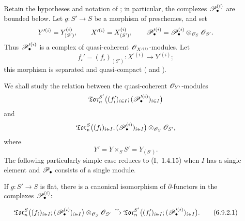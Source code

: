 \begin{env}[6.9.1]
\label{III.6.9.1}
Retain the hypotheses and notation of ; in
particular, the complexes $\mathscr{P}_\bullet^{(i)}$ are bounded below.
Let $g:S'\to S$ be a morphism of preschemes, and set
\[
  Y^{\prime(i)}=Y_{(S')}^{(i)},
  \qquad
  X^{\prime(i)}=X_{(S')}^{(i)},
  \qquad
  \mathscr{P}_\bullet^{\prime(i)}
  =
  \mathscr{P}_\bullet^{(i)}
  \otimes_{\mathscr{O}_S}\mathscr{O}_{S'}.
\]
Thus $\mathscr{P}_\bullet^{\prime(i)}$ is a complex of quasi-coherent
$\mathscr{O}_{X^{\prime(i)}}$-modules.  Let
\[
  f_i'=(f_i)_{(S')}:
  X^{\prime(i)}\longrightarrow Y^{\prime(i)};
\]
this morphism is separated and quasi-compact
( and ).

We shall study the relation between the quasi-coherent
$\mathscr{O}_{Y'}$-modules
\[
  \mathfrak{Tor}_n^{S'}
  \bigl(
    (f_i')_{i\in I};
    (\mathscr{P}_\bullet^{\prime(i)})_{i\in I}
  \bigr)
\]
and
\[
  \mathfrak{Tor}_n^S
  \bigl(
    (f_i)_{i\in I};
    (\mathscr{P}_\bullet^{(i)})_{i\in I}
  \bigr)
  \otimes_{\mathscr{O}_S}\mathscr{O}_{S'},
\]
where
\[
  Y'=Y\times_SS'=Y_{(S')}.
\]
The following particularly simple case reduces to
(I,~1.4.15) when $I$ has a single element and
$\mathscr{P}_\bullet$ consists of a single module.
\end{env}

\begin{proposition}[6.9.2]
\label{III.6.9.2}
If $g:S'\to S$ is flat, there is a canonical isomorphism of
$\partial$-functors in the complexes $\mathscr{P}_\bullet^{(i)}$:
\begin{env}[6.9.2.1]
\label{III.6.9.2.1}
\[
  \mathfrak{Tor}_n^S
  \bigl(
    (f_i)_{i\in I};
    (\mathscr{P}_\bullet^{(i)})_{i\in I}
  \bigr)
  \otimes_{\mathscr{O}_S}\mathscr{O}_{S'}
  \xrightarrow{\sim}
  \mathfrak{Tor}_n^{S'}
  \bigl(
    (f_i')_{i\in I};
    (\mathscr{P}_\bullet^{\prime(i)})_{i\in I}
  \bigr).
  \tag{6.9.2.1}\label{III.6.9.2.1.eq}
\]
\end{env}
\end{proposition}

